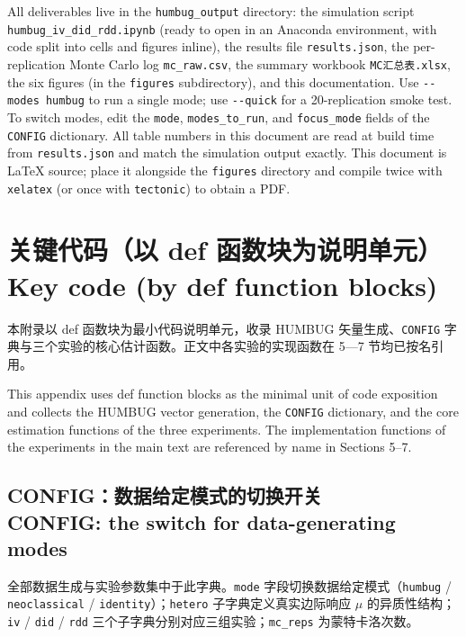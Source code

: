 \documentclass[12pt,a4paper]{ctexart}
\begin{document}
All deliverables live in the \texttt{humbug\_output} directory: the simulation script \texttt{humbug\_iv\_did\_rdd.ipynb} (ready to open in an Anaconda environment, with code split into cells and figures inline), the results file \texttt{results.json}, the per-replication Monte Carlo log \texttt{mc\_raw.csv}, the summary workbook \texttt{MC汇总表.xlsx}, the six figures (in the \texttt{figures} subdirectory), and this documentation. Use \texttt{-{}-modes humbug} to run a single mode; use \texttt{-{}-quick} for a 20-replication smoke test. To switch modes, edit the \texttt{mode}, \texttt{modes\_to\_run}, and \texttt{focus\_mode} fields of the \texttt{CONFIG} dictionary. All table numbers in this document are read at build time from \texttt{results.json} and match the simulation output exactly. This document is LaTeX source; place it alongside the \texttt{figures} directory and compile twice with \texttt{xelatex} (or once with \texttt{tectonic}) to obtain a PDF.

\appendix


\section[关键代码]{关键代码（以 def 函数块为说明单元）\\[2pt]\normalsize Key code (by def function blocks)}

本附录以 def 函数块为最小代码说明单元，收录 HUMBUG 矢量生成、\texttt{CONFIG} 字典与三个实验的核心估计函数。正文中各实验的实现函数在 5—7 节均已按名引用。

This appendix uses def function blocks as the minimal unit of code exposition and collects the HUMBUG vector generation, the \texttt{CONFIG} dictionary, and the core estimation functions of the three experiments. The implementation functions of the experiments in the main text are referenced by name in Sections 5--7.

\subsection[CONFIG]{CONFIG：数据给定模式的切换开关\\[1pt]\normalsize CONFIG: the switch for data-generating modes}

全部数据生成与实验参数集中于此字典。\texttt{mode} 字段切换数据给定模式（\texttt{humbug} / \texttt{neoclassical} / \texttt{identity}）；\texttt{hetero} 子字典定义真实边际响应 $\mu$ 的异质性结构；\texttt{iv} / \texttt{did} / \texttt{rdd} 三个子字典分别对应三组实验；\texttt{mc\_reps} 为蒙特卡洛次数。
\end{document}
